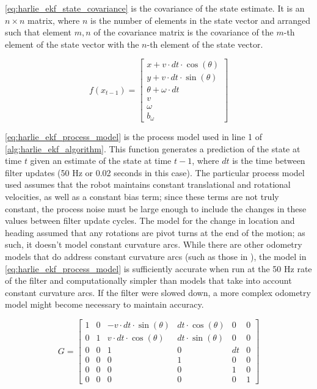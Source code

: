 \eqref{eq:harlie_ekf_state_covariance} is the covariance of the state estimate. It is an $n\times n$ matrix, where $n$ is the number of elements in the state vector and arranged such that element $m,n$ of the covariance matrix is the covariance of the $m$-th element of the state vector with the $n$-th element of the state vector.

\begin{equation}
	f\left(x_{t-1}\right) =
	\begin{bmatrix}
		x + v \cdot dt \cdot \cos\left(\theta\right) \\
		y + v \cdot dt \cdot \sin\left(\theta\right)  \\
		\theta + \omega \cdot dt \\
		v \\
		\omega \\
		b_{\omega}
	\end{bmatrix}
	\label{eq:harlie_ekf_process_model}
\end{equation}

\eqref{eq:harlie_ekf_process_model} is the process model used in line 1 of \autoref{alg:harlie_ekf_algorithm}. This function generates a prediction of the state at time $t$ given an estimate of the state at time $t-1$, where $dt$ is the time between filter updates (50 Hz or 0.02 seconds in this case). The particular process model used assumes that the robot maintains constant translational and rotational velocities, as well as a constant bias term; since these terms are not truly constant, the process noise must be large enough to include the changes in these values between filter update cycles. The model for the change in location and heading assumed that any rotations are pivot turns at the end of the motion; as such, it doesn't model constant curvature arcs. While there are other odometry models that do address constant curvature arcs (such as those in \autocite{ProbRobotics}), the model in \eqref{eq:harlie_ekf_process_model} is sufficiently accurate when run at the 50 Hz rate of the filter and computationally simpler than models that take into account constant curvature arcs. If the filter were slowed down, a more complex odometry model might become necessary to maintain accuracy. 

\begin{equation}
	G =
	\begin{bmatrix}
		1 & 0 & -v \cdot dt \cdot \sin\left(\theta\right) & dt \cdot \cos\left(\theta\right) & 0 & 0 \\
		0 & 1 & v \cdot dt \cdot \cos\left(\theta\right) & dt \cdot \sin\left(\theta\right) & 0 & 0 \\
		0 & 0 & 1 & 0 & dt & 0 \\
		0 & 0 & 0 & 1 & 0 & 0 \\
		0 & 0 & 0 & 0 & 1 & 0 \\
		0 & 0 & 0 & 0 & 0 & 1 
	\end{bmatrix}
	\label{eq:harlie_ekf_process_jacobian}
\end{equation}

